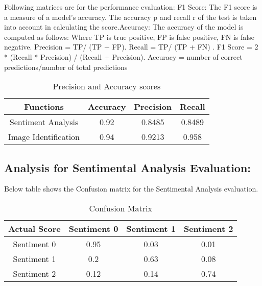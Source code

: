 \documentclass[10pt,conference]{IEEEtran}
\begin{document}
{\raggedright
Following matrices are for the performance evaluation: F1 Score: The F1 score is a measure of a model's accuracy. The accuracy p and recall r of the test is taken into account in calculating the score.Accuracy: The accuracy of the model is computed as follows:  Where TP is true positive, FP is false positive, FN is false negative.\newline
Precision = TP/ (TP + FP).\newline
Recall = TP/ (TP + FN) .\newline
F1 Score = 2 * (Recall * Precision) / (Recall + Precision).\newline
Accuracy = number of correct predictions/number of total predictions\newline
}

{\raggedright
\begin{table}[ht]
\caption{Precision and Accuracy scores} %
\centering %
\begin{tabular}{c c c c} %
\hline %
Functions & Accuracy & Precision & Recall \\ [0.ex] %
\hline %
Sentiment Analysis & 0.92  & 0.8485 & 0.8489 \\ %
Image Identification & 0.94 & 0.9213 & 0.958  \\
\hline %
\end{tabular}
\label{table:nonlin} %
\end{table}
}


\subsection{Analysis for Sentimental Analysis Evaluation:}

{\raggedright
Below table shows the Confusion matrix for the Sentimental Analysis evaluation.
}

{\raggedright
\begin{table}[ht]
\caption{Confusion Matrix} %
\centering %
\begin{tabular}{c c c c} %
\hline %
Actual Score & Sentiment 0 & Sentiment 1 & Sentiment 2 \\ [0.ex] %
\hline %
Sentiment 0 & 0.95  & 0.03 & 0.01 \\ %
Sentiment 1 & 0.2 & 0.63 & 0.08  \\
Sentiment 2 & 0.12 & 0.14  & 0.74 \\ [1ex] %
\hline %
\end{tabular}
\label{table:nonlin} %
\end{table}
}
\end{document}
